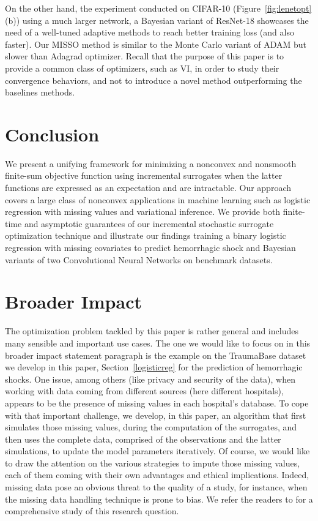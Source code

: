 \documentclass[11pt]{article}
\theoremstyle{t}
\begin{document}
On the other hand, the experiment conducted on CIFAR-10 (Figure~\ref{fig:lenetopt}(b)) using a much larger network, \ie a Bayesian variant of ResNet-18 showcases the need of a well-tuned adaptive methods to reach better training loss (and also faster). Our MISSO method is similar to the Monte Carlo variant of ADAM but slower than Adagrad optimizer. Recall that the purpose of this paper is to provide a common class of optimizers, such as VI, in order to study their convergence behaviors, and not to introduce a novel method outperforming the baselines methods.
\vspace{-0.05in}
\section{Conclusion}
\vspace{-0.05in}
We present a unifying framework for minimizing a nonconvex and nonsmooth finite-sum objective function using incremental surrogates when the latter functions are expressed as an expectation and are intractable.
Our approach covers a large class of nonconvex applications in machine learning such as logistic regression with missing values and variational inference.
We provide both finite-time and asymptotic guarantees of our incremental stochastic surrogate optimization technique and illustrate our findings training a binary logistic regression with missing covariates to predict hemorrhagic shock and Bayesian variants of two Convolutional Neural Networks on benchmark datasets.

\newpage

\section{Broader Impact}
The optimization problem tackled by this paper is rather general and includes many sensible and important use cases.
The one we would like to focus on in this broader impact statement paragraph is the example on the TraumaBase dataset we develop in this paper, Section~\ref{logisticreg} for the prediction of hemorrhagic shocks.
One issue, among others (like privacy and security of the data), when working with data coming from different sources (here different hospitals), appears to be the presence of missing values in each hospital's database.
To cope with that important challenge, we develop, in this paper, an algorithm that first simulates those missing values, during the computation of the surrogates, and then uses the complete data, comprised of the observations and the latter simulations, to update the model parameters iteratively.
Of course, we would like to draw the attention on the various strategies to impute those missing values, each of them coming with their own advantages and ethical implications.
Indeed, missing data pose an obvious threat to the quality of a study, for instance, when the missing data handling technique is prone to bias.
We refer the readers to \citep{enders2011impact} for a comprehensive study of this research question.
\end{document}
